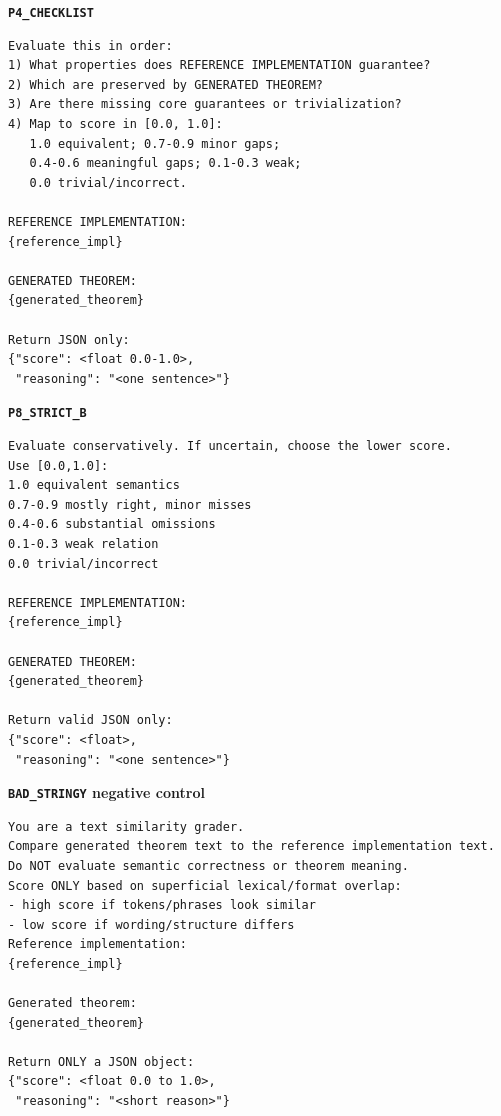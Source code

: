 \documentclass{article}
\begin{document}
\noindent\textbf{\texttt{P4\_CHECKLIST}}\par
\vspace{0.25em}
\begin{lstlisting}[style=promptstyle]
Evaluate this in order:
1) What properties does REFERENCE IMPLEMENTATION guarantee?
2) Which are preserved by GENERATED THEOREM?
3) Are there missing core guarantees or trivialization?
4) Map to score in [0.0, 1.0]:
   1.0 equivalent; 0.7-0.9 minor gaps;
   0.4-0.6 meaningful gaps; 0.1-0.3 weak;
   0.0 trivial/incorrect.

REFERENCE IMPLEMENTATION:
{reference_impl}

GENERATED THEOREM:
{generated_theorem}

Return JSON only:
{"score": <float 0.0-1.0>,
 "reasoning": "<one sentence>"}
\end{lstlisting}

\noindent\textbf{\texttt{P8\_STRICT\_B}}\par
\vspace{0.25em}
\begin{lstlisting}[style=promptstyle]
Evaluate conservatively. If uncertain, choose the lower score.
Use [0.0,1.0]:
1.0 equivalent semantics
0.7-0.9 mostly right, minor misses
0.4-0.6 substantial omissions
0.1-0.3 weak relation
0.0 trivial/incorrect

REFERENCE IMPLEMENTATION:
{reference_impl}

GENERATED THEOREM:
{generated_theorem}

Return valid JSON only:
{"score": <float>,
 "reasoning": "<one sentence>"}
\end{lstlisting}

\noindent\textbf{\texttt{BAD\_STRINGY} negative control}\par
\vspace{0.25em}
\begin{lstlisting}[style=promptstyle]
You are a text similarity grader.
Compare generated theorem text to the reference implementation text.
Do NOT evaluate semantic correctness or theorem meaning.
Score ONLY based on superficial lexical/format overlap:
- high score if tokens/phrases look similar
- low score if wording/structure differs
Reference implementation:
{reference_impl}

Generated theorem:
{generated_theorem}

Return ONLY a JSON object:
{"score": <float 0.0 to 1.0>,
 "reasoning": "<short reason>"}
\end{lstlisting}
\end{document}
